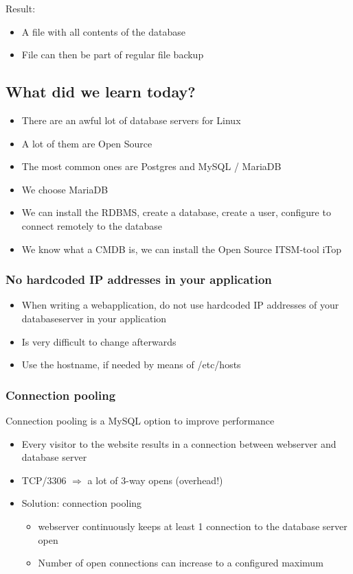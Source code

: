 \documentclass{article}
\begin{document}
Result:

\begin{itemize}
    \item A file with all contents of the database
    \item File can then be part of regular file backup
\end{itemize}

\subsection{What did we learn today?}

\begin{itemize}
    \item There are an awful lot of database servers for Linux
    \item A lot of them are Open Source
    \item The most common ones are Postgres and MySQL / MariaDB
    \item We choose MariaDB
    \item We can install the RDBMS, create a database, create a user, configure to connect remotely to the database
    \item We know what a CMDB is, we can install the Open Source ITSM-tool iTop
\end{itemize}

\subsubsection{No hardcoded IP addresses in your application}

\begin{itemize}
    \item When writing a webapplication, do not use hardcoded IP addresses of your databaseserver in your application
    \item Is very difficult to change afterwards
    \item Use the hostname, if needed by means of /etc/hosts
\end{itemize}

\subsubsection{Connection pooling}

Connection pooling is a MySQL option to improve performance

\begin{itemize}
    \item Every visitor to the website results in a connection between webserver and database server
    \item TCP/3306 $\Rightarrow$ a lot of 3-way opens (overhead!)
    \item Solution: connection pooling
    \begin{itemize}
        \item webserver continuously keeps at least 1 connection to the database server open
        \item Number of open connections can increase to a configured maximum
    \end{itemize}
\end{itemize}
\end{document}
